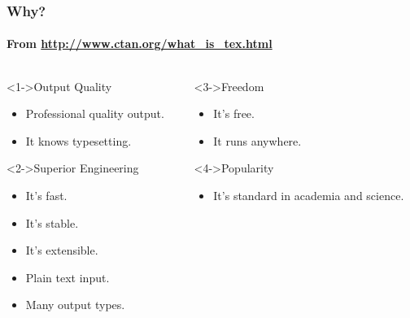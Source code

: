 
\begin{frame}
\frametitle{Why?}
\framesubtitle{From \url{http://www.ctan.org/what_is_tex.html}}
\begin{columns}[T]
\begin{column}{.48\textwidth}
\begin{varblock}<1->{Output Quality}
\begin{itemize}
\item Professional quality output.
\item It knows typesetting.
\end{itemize}
\end{varblock}

\begin{varblock}<2->{Superior Engineering}
\begin{itemize}
\item It's fast.
\item It's stable.
\item It's extensible.
\item Plain text input.
\item Many output types.
\end{itemize}
\end{varblock}
\end{column}

\begin{column}{.48\textwidth}
\begin{varblock}<3->{Freedom}
\begin{itemize}
\item It's free.
\item It runs anywhere.
\end{itemize}
\end{varblock}

\begin{varblock}<4->{Popularity}
\begin{itemize}
\item It's standard in academia and science.
\end{itemize}
\end{varblock}
\end{column}
\end{columns}
\end{frame}

